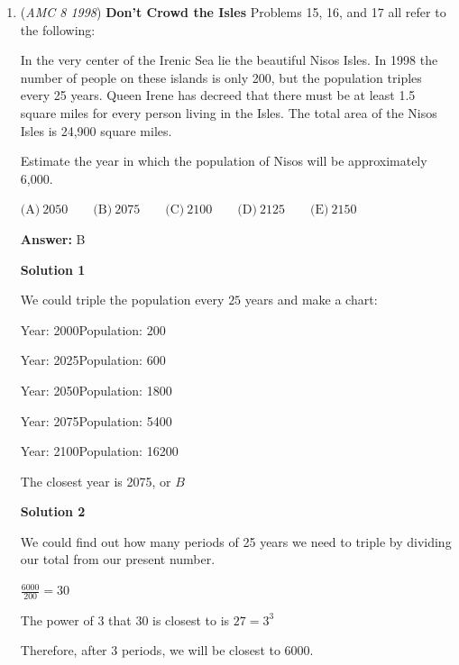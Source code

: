 \begin{enumerate}
The population triples every $25$ years from $200$, and there are $50$ years between $2000$ and $2050$, so we will have $200\times3=600\times3=1800$.

 This is an underestimate, since there are actually $2$ more years for the island's population to grow.

 Therefore, $1800$ can be rounded to $\text{(D)}\ 2000$



	\item (\textit{AMC 8 1998}) \textbf{Don't Crowd the Isles} Problems 15, 16, and 17 all refer to the following:


 
In the very center of the Irenic Sea lie the beautiful Nisos Isles.  In 1998 the number of people on these islands is only 200, but the population triples every 25 years.  Queen Irene has decreed that there must be at least 1.5 square miles for every person living in the Isles.  The total area of the Nisos Isles is 24,900 square miles.


 


 Estimate the year in which the population of Nisos will be approximately 6,000.


 $\text{(A)}\ 2050 \qquad \text{(B)}\ 2075 \qquad \text{(C)}\ 2100 \qquad \text{(D)}\ 2125 \qquad \text{(E)}\ 2150$

 \textbf{Answer: }B



\textbf{Solution 1}

We could triple the population every $25$ years and make a chart:

 Year: 2000Population: 200

 Year: 2025Population: 600

 Year: 2050Population: 1800

 Year: 2075Population: 5400

 Year: 2100Population: 16200

 The closest year is 2075, or $\boxed{B}$




\textbf{Solution 2}

We could find out how many periods of 25 years we need to triple by dividing our total from our present number.

 $\frac{6000}{200}=30$

 The power of $3$ that $30$ is closest to is $27=3^3$

 Therefore, after $3$ periods, we will be closest to $6000$.


\end{enumerate}
